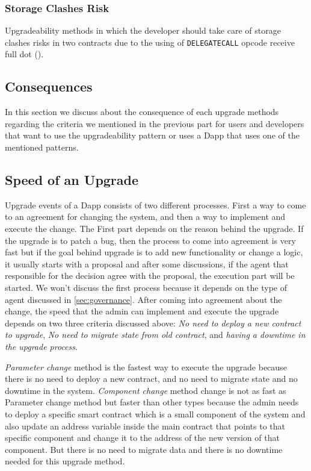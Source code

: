 \subsubsection{Storage Clashes Risk}
Upgradeability methods in which the developer should take care of storage clashes risks in two contracts due to the using of \texttt{DELEGATECALL} opcode receive full dot (\full). 



\subsection{Consequences}
In this section we discuss about the consequence of each upgrade methods regarding the criteria we mentioned in the previous part for users and developers that want to use the upgradeability pattern or uses a Dapp that uses one of the mentioned patterns.

\subsection{Speed of an Upgrade}
Upgrade events of a Dapp consists of two different processes. First a way to come to an agreement for changing the system, and then a way to implement and execute the change. The First part depends on the reason behind the upgrade. If the upgrade is to patch a bug, then the process to come into agreement is very fast but if the goal behind upgrade is to add new functionality or change a logic, it usually starts with a proposal and after some discussions, if the agent that responsible for the decision agree with the proposal, the execution part will be started. We won't discuss the first process because it depends on the type of agent discussed in \ref{sec:governance}.
After coming into agreement about the change, the speed that the admin can implement and execute the upgrade depends on two three criteria discussed above: \textit{No need to deploy a new contract to upgrade}, \textit{No need to migrate state from old contract}, and \textit{having a downtime in the upgrade process}.
 
\textit{Parameter change} method is the fastest way to execute the upgrade because there is no need to deploy a new contract, and no need to migrate state and no downtime in the system.
\textit{Component change} method change is not as fast as Parameter change method but faster than other types because the admin needs to deploy a specific smart contract which is a small component of the system and also update an address variable inside the main contract that points to that specific component and change it to the address of the new version of that component. But there is no need to migrate data and there is no downtime needed for this upgrade method.

